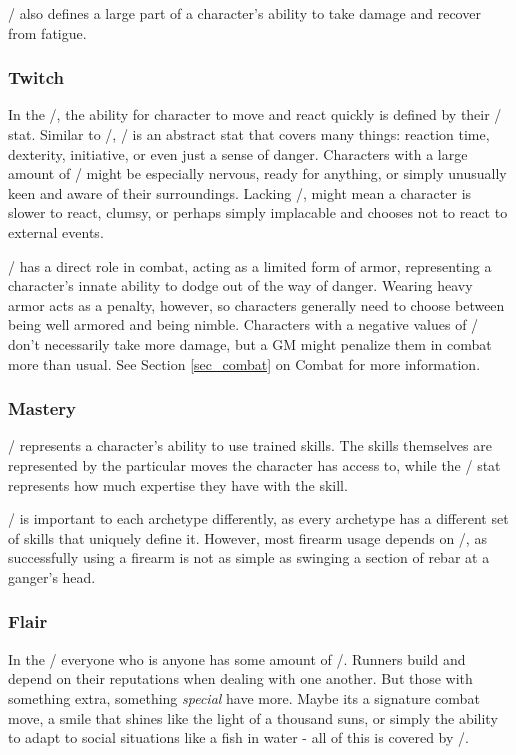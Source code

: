 \documentclass[oneside,10pt]{article}
\begin{document}
\begin{multicols}{2}
\oomph/ also defines a large part of a character's ability to take
damage and recover from fatigue.  

\subsubsection{Twitch}
\label{stat_twitch}

In the \SW/, the ability for character to move and react quickly is
defined by their \twitch/ stat. Similar to \oomph/, \twitch/ is an
abstract stat that covers many things: reaction time, dexterity,
initiative, or even just a sense of danger. Characters with a large
amount of \twitch/ might be especially nervous, ready for anything, or
simply unusually keen and aware of their surroundings. Lacking
\twitch/, might mean a character is slower to react, clumsy, or perhaps
simply implacable and chooses not to react to external events.

\twitch/ has a direct role in combat, acting as a limited form of
armor, representing a character's innate ability to dodge out of the
way of danger. Wearing heavy armor acts as a penalty, however, so
characters generally need to choose between being well armored and
being nimble. Characters with a negative values of \twitch/ don't
necessarily take more damage, but a GM might penalize them in combat
more than usual. See Section \ref{sec_combat} on Combat for more information.

\subsubsection{Mastery}
\label{stat_mastery}

\mastery/ represents a character's ability to use trained skills. The
skills themselves are represented by the particular moves the
character has access to, while the \mastery/ stat represents how much
expertise they have with the skill.

\mastery/ is important to each archetype differently, as every
archetype has a different set of skills that uniquely define
it. However, most firearm usage depends on \mastery/, as successfully
using a firearm is not as simple as swinging a section of rebar at a
ganger's head.  

\subsubsection{Flair}
\label{stat_flair}

In the \SW/ everyone who is anyone has some amount of \flair/. Runners
build and depend on their reputations when dealing with one
another. But those with something extra, something \textit{special}
have more. Maybe its a signature combat move, a smile that shines
like the light of a thousand suns, or simply the ability to adapt to
social situations like a fish in water - all of this is covered by
\flair/.


\end{multicols}
\end{document}
